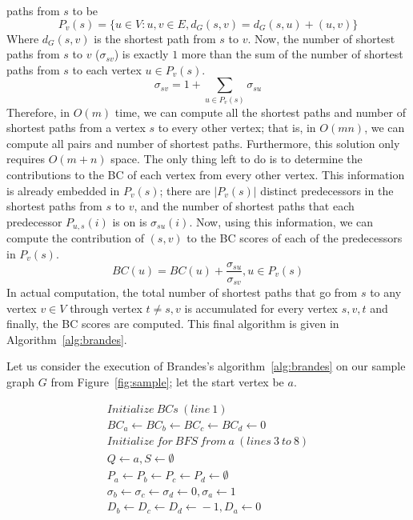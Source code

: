 paths from $s$ to be
%
\begin{equation}
P_v(s)=\{u\in{}V:{u,v}\in{}E,d_G(s,v)=d_G(s,u)+(u,v)\}
\end{equation}
%
Where $d_G(s,v)$ is the shortest path from $s$ to $v$.
%
Now, the number of shortest paths from $s$ to $v$ ($\sigma{}_{sv}$) is exactly
$1$ more than the sum of the number of shortest paths from $s$ to each vertex
$u\in{}P_v(s)$. 
%
\begin{equation}
\sigma{}_{sv} = 1 + \sum_{u\in{}P_v(s)}\sigma{}_{su}
\end{equation}
%
Therefore, in $O(m)$ time, we can compute all the shortest paths and number of
shortest paths from a vertex $s$ to every other vertex; that is, in $O(mn)$,
we can compute all pairs and number of shortest paths.
%
Furthermore, this solution only requires $O(m+n)$ space.
%
The only thing left to do is to determine the contributions to the BC of each
vertex from every other vertex.
%
This information is already embedded in $P_v(s)$; there are
$\lvert{}P_v(s)\rvert{}$ distinct predecessors in the shortest paths from $s$
to $v$, and the number of shortest paths that each predecessor $P_{u,s}(i)$
is on is $\sigma{}_{su}(i)$. 
%
Now, using this information, we can compute the contribution of $(s,v)$ to 
the BC scores of each of the predecessors in $P_v(s)$.
%
\begin{equation}
BC(u) = BC(u) + \frac{\sigma{}_{su}}{\sigma{}_{sv}}, u\in{}P_v(s)
\end{equation}
%
In actual computation, the total number of shortest paths that go from $s$ to 
any vertex $v\in{}V$ through vertex $t\ne{}s,v$ is accumulated for every vertex
$s,v,t$ and finally, the BC scores are computed.
%
This final algorithm is given in Algorithm~\ref{alg:brandes}.

%
Let us consider the execution of Brandes's algorithm~\ref{alg:brandes} on our
sample graph $G$ from Figure~\ref{fig:sample}; let the start vertex be $a$.

\begin{align*}
Initialize\ BCs\ (line\ 1)\\
BC_a\leftarrow{}BC_b\leftarrow{}BC_c\leftarrow{}BC_d\leftarrow{}0\\
Initialize\ for\ BFS\ from\ a\ (lines\ 3\ to\ 8) \\ 
Q \leftarrow{} a, S \leftarrow{} \emptyset{} \\
P_a\leftarrow{}P_b\leftarrow{}P_c\leftarrow{}P_d\leftarrow{}\emptyset{}\\
\sigma{}_b\leftarrow{}\sigma{}_c\leftarrow{}\sigma{}_d\leftarrow{}0, \sigma{}_a\leftarrow{}1\\
D_b\leftarrow{}D_c\leftarrow{}D_d\leftarrow{}-1, D_a\leftarrow{}0
\end{align*}

